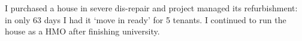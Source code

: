 I purchased a house in severe dis-repair and project managed its refurbishment: in only 63 days I had it `move in ready' for 5 tenants. I continued to run the house as a HMO after finishing university.
\sectionsep{}
\vfill{}